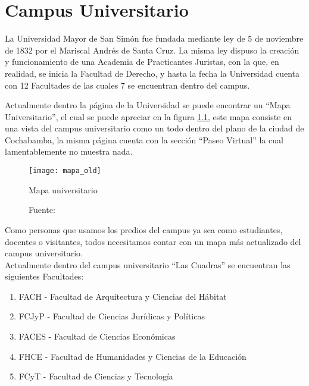 \chapter{Campus Universitario}
\label{chap:Campus Universitario}

La Universidad Mayor de San Simón fue fundada mediante ley de 5 de noviembre de 1832 por el Mariscal Andrés de Santa Cruz. La misma ley dispuso la creación y funcionamiento de una Academia de Practicantes Juristas, con la que, en realidad, se inicia la Facultad de Derecho, y hasta la fecha la Universidad cuenta con 12 Facultades de las cuales 7 se encuentran dentro del campus. \cite{umss_history}

Actualmente dentro la página de la Universidad se puede encontrar un ``Mapa Universitario'', el cual se puede apreciar en la figura \ref{fig:mapa_old}, este mapa consiste en una vista del campus universitario como un todo dentro del plano de la ciudad de Cochabamba, la misma página cuenta con la sección ``Paseo Virtual'' la cual lamentablemente no muestra nada.\\

\begin{figure}[H]
  \begin{center}
    \texttt{[image: mapa\_old]}
    \caption{Mapa universitario}
    \label{fig:mapa_old}
    \caption*{Fuente: \cite{umss_mapa}}
  \end{center}
\end{figure}


Como personas que usamos los predios del campus ya sea como estudiantes, docentes o visitantes, todos necesitamos contar con un mapa más actualizado del campus universitario.\\

Actualmente dentro del campus universitario ``Las Cuadras'' se encuentran las siguientes Facultades:

\begin{enumerate}
\item FACH - Facultad de Arquitectura y Ciencias del Hábitat

\item FCJyP - Facultad de Ciencias Jurídicas y Políticas

\item FACES - Facultad de Ciencias Económicas


\item FHCE - Facultad de Humanidades y Ciencias de la Educación

\item FCyT - Facultad de Ciencias y Tecnología

\end{enumerate}

